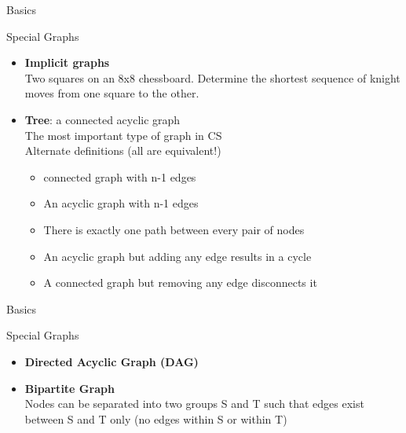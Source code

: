 \documentclass{beamer}
\begin{document}
\begin{frame}[<+->]{Basics}
\begin{block}{Special Graphs}
  \begin{itemize}
    \item \small{{\bf Implicit graphs}\\
      Two squares on an 8x8 chessboard. Determine the shortest sequence of knight moves from one square to the other.}
    \item \small{{\bf Tree}: a connected acyclic graph\\
      The most important type of graph in CS\\
      Alternate definitions (all are equivalent!)\\}
      \begin{itemize}
	\item \small{connected graph with n-1 edges}
	\item \small{An acyclic graph with n-1 edges}
	\item \small{There is exactly one path between every pair of nodes}
	\item \small{An acyclic graph but adding any edge results in a cycle}
	\item \small{A connected graph but removing any edge disconnects it}
      \end{itemize}
    \end{itemize}
\end{block}
\end{frame}

\begin{frame}[<+->]{Basics}
\begin{block}{Special Graphs}
  \begin{itemize}
    \item \small{{\bf Directed Acyclic Graph (DAG)}}
    \item \small{{\bf Bipartite Graph}\\
      Nodes can be separated into two groups S and T such that edges exist between S and T only (no edges within S or within T)}
  \end{itemize}
\end{block}
\end{frame}
\end{document}
